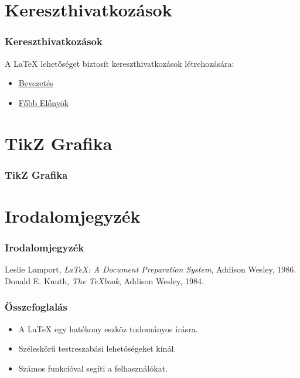 \documentclass{beamer}
\begin{document}
\section{Kereszthivatkozások}
\begin{frame}
    \frametitle{Kereszthivatkozások}
    A LaTeX lehetőséget biztosít kereszthivatkozások létrehozására:
    \begin{itemize}
        \item \hyperlink{sec:introduction}{Bevezetés}
        \item \hyperlink{sec:benefits}{Főbb Előnyök}
    \end{itemize}
\end{frame}

\section{TikZ Grafika}
\begin{frame}
    \centering
    \frametitle{TikZ Grafika}
\end{frame}

\section{Irodalomjegyzék}
\begin{frame}
    \frametitle{Irodalomjegyzék}
    \begin{thebibliography}{9}
            Leslie Lamport,
            \textit{LaTeX: A Document Preparation System},
            Addison Wesley, 1986.
            Donald E. Knuth,
            \textit{The TeXbook},
            Addison Wesley, 1984.
    \end{thebibliography}
\end{frame}

\begin{frame}
    \frametitle{Összefoglalás}
    \begin{itemize}
        \item A LaTeX egy hatékony eszköz tudományos írásra.
        \item Széleskörű testreszabási lehetőségeket kínál.
        \item Számos funkcióval segíti a felhasználókat.
    \end{itemize}
\end{frame}
\end{document}
